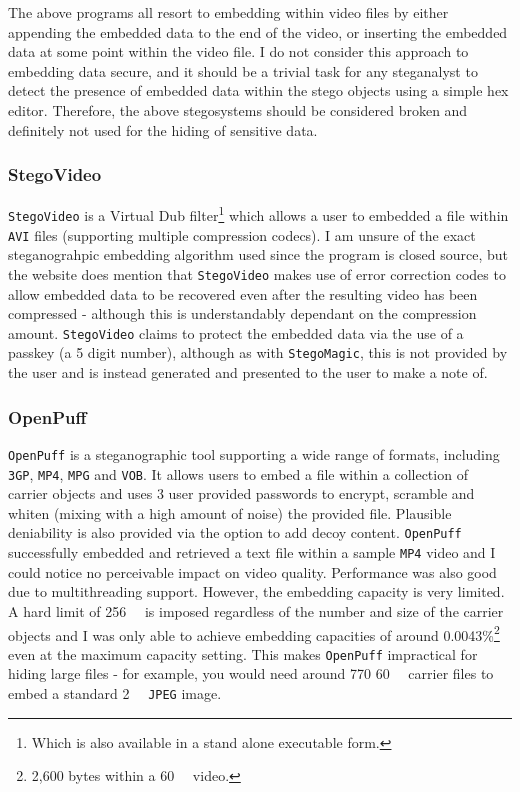 \documentclass[paper=a4, fontsize=11pt,twoside]{scrartcl}    %
\begin{document}
\noindent
The above programs all resort to embedding within video files by either appending the embedded data to the end of the video, or inserting the embedded data at some point within the video file. I do not consider this approach to embedding data secure, and it should be a trivial task for any steganalyst to detect the presence of embedded data within the stego objects using a simple hex editor. Therefore, the above stegosystems should be considered broken and definitely not used for the hiding of sensitive data.

\subsubsection{StegoVideo}

\texttt{StegoVideo} is a Virtual Dub filter\footnote{Which is also available in a stand alone executable form.} which allows a user to embedded a file within \texttt{AVI} files (supporting multiple compression codecs). I am unsure of the exact steganograhpic embedding algorithm used since the program is closed source, but the website does mention that \texttt{StegoVideo} makes use of error correction codes to allow embedded data to be recovered even after the resulting video has been compressed - although this is understandably dependant on the compression amount. \texttt{StegoVideo} claims to protect the embedded data via the use of a passkey (a 5 digit number), although as with \texttt{StegoMagic}, this is not provided by the user and is instead generated and presented to the user to make a note of.

\subsubsection{OpenPuff}

\texttt{OpenPuff} is a steganographic tool supporting a wide range of formats, including \texttt{3GP}, \texttt{MP4}, \texttt{MPG} and \texttt{VOB}. It allows users to embed a file within a collection of carrier objects and uses 3 user provided passwords to encrypt, scramble and whiten (mixing with a high amount of noise) the provided file. Plausible deniability is also provided via the option to add decoy content. \texttt{OpenPuff} successfully embedded and retrieved a text file within a sample \texttt{MP4} video and I could notice no perceivable impact on video quality. Performance was also good due to multithreading support. However, the embedding capacity is very limited. A hard limit of \SI{256}{\mega\byte} is imposed regardless of the number and size of the carrier objects and I was only able to achieve embedding capacities of around 0.0043\%\footnote{2,600 bytes within a \SI{60}{\mega\byte} video.} even at the maximum capacity setting. This makes \texttt{OpenPuff} impractical for hiding large files - for example, you would need around 770 \SI{60}{\mega\byte} carrier files to embed a standard \SI{2}{\mega\byte} \texttt{JPEG} image.
\end{document}
